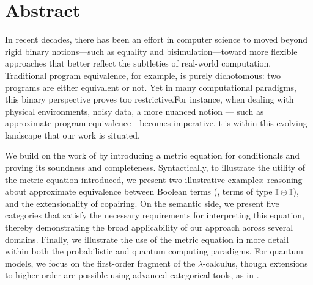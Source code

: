 \chapter*{Abstract}

\begin{comment}
Noisy intermediate-scale quantum (NISQ)  computers are expected to operate with severely limited hardware resources. Precisely controlling qubits in these systems comes at a high cost, is susceptible to errors, and faces scarcity challenges. Therefore, error analysis is indispensable for the design, optimization, and assessment of NISQ computing. Nevertheless, the analysis of errors in quantum programs poses a significant challenge. The overarching goal of the M.Sc. project is to provide a fully-fledged
quantum programming language on which to study metric program equivalence
in various scenarios, such as in quantum algorithmics and quantum information theory.
\end{comment}

In recent decades, there has been an effort in computer science to moved beyond rigid binary notions—such as equality and bisimulation—toward more flexible approaches that better reflect the  subtleties of real-world computation. Traditional program equivalence, for example, is purely dichotomous: two programs are either equivalent or not. Yet in many computational paradigms, this binary perspective proves too restrictive.For instance, when dealing with physical environments, noisy data, a more nuanced notion --- such as approximate program equivalence---becomes imperative. t is within this evolving landscape that our work is situated.

We build on the work of \cite{dahlqvist2023syntactic} by introducing a metric equation for conditionals and proving its soundness and completeness. 
Syntactically, to illustrate the utility of the metric equation introduced, we present two illustrative examples: reasoning about approximate equivalence between Boolean terms (\ie, terms of type $ \mathbb{I} \oplus \mathbb{I} $), and the extensionality of copairing. On the semantic side, we present five categories that satisfy the necessary requirements for interpreting this equation, thereby demonstrating the broad applicability of our approach across several domains. Finally, we illustrate the use of the metric equation in more detail within both the probabilistic and quantum computing paradigms. For quantum models, we focus on the first-order fragment of the $\lambda$-calculus, though extensions to higher-order are possible using advanced categorical tools, as in \cite{dahlqvist2023syntactic}. 

